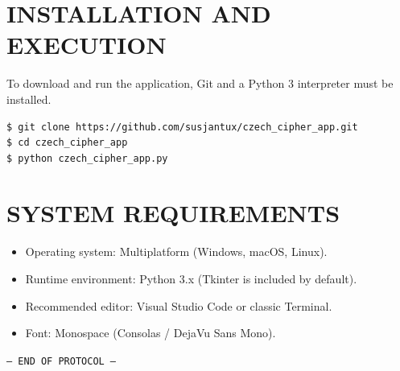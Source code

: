 \documentclass[12pt]{article}
\begin{document}
\section{INSTALLATION AND EXECUTION}
To download and run the application, Git and a Python 3 interpreter must be installed.
\begin{Verbatim}[frame=single, rulecolor=\color{text_zelena}, fontsize=\large]
$ git clone https://github.com/susjantux/czech_cipher_app.git
$ cd czech_cipher_app
$ python czech_cipher_app.py
\end{Verbatim}

\section{SYSTEM REQUIREMENTS}
\begin{itemize}
    \item Operating system: Multiplatform (Windows, macOS, Linux).
    \item Runtime environment: Python 3.x (Tkinter is included by default).
    \item Recommended editor: Visual Studio Code or classic Terminal.
    \item Font: Monospace (Consolas / DejaVu Sans Mono).
\end{itemize}

\vspace{2cm}
\begin{center}
    \texttt{\Large --- END OF PROTOCOL ---}
\end{center}
\end{document}
